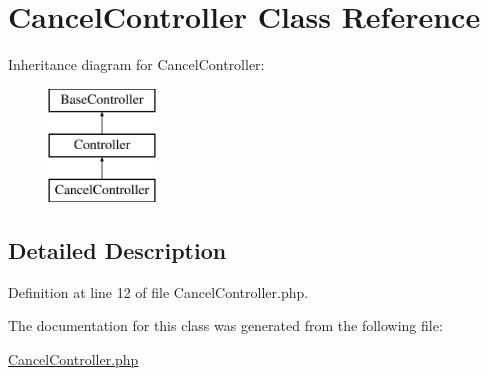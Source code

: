 \hypertarget{class_responsive_1_1_http_1_1_controllers_1_1_cancel_controller}{}\section{Cancel\+Controller Class Reference}
\label{class_responsive_1_1_http_1_1_controllers_1_1_cancel_controller}
Inheritance diagram for Cancel\+Controller\+:\begin{figure}[H]
\begin{center}
\leavevmode
\includegraphics[height=3.000000cm]{class_responsive_1_1_http_1_1_controllers_1_1_cancel_controller}
\end{center}
\end{figure}


\subsection{Detailed Description}


Definition at line 12 of file Cancel\+Controller.\+php.



The documentation for this class was generated from the following file\+:\begin{DoxyCompactItemize}
\item 
\mbox{\hyperlink{_cancel_controller_8php}{Cancel\+Controller.\+php}}\end{DoxyCompactItemize}
